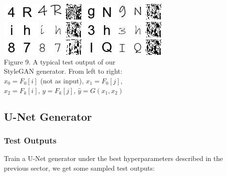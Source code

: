 \documentclass[letterpaper]{article}
\begin{document}
\begin{center}
    \includegraphics[width=.2\textwidth]{./update-figs/e2estylegan_1.jpg}
    \includegraphics[width=.2\textwidth]{./update-figs/e2estylegan_2.jpg}\\
    \includegraphics[width=.2\textwidth]{./update-figs/e2estylegan_3.jpg}
    \includegraphics[width=.2\textwidth]{./update-figs/e2estylegan_4.jpg}\\
    \includegraphics[width=.2\textwidth]{./update-figs/e2estylegan_5.jpg}
    \includegraphics[width=.2\textwidth]{./update-figs/e2estylegan_6.jpg}\\

    Figure 9. A typical test output of our\\StyleGAN generator. From left to right:\\$x_0=F_0[i]$ (not as input), $x_1=F_0[j]$,\\$x_2=F_k[i]$, $y=F_k[j]$, $\hat{y}=G(x_1,x_2)$
\end{center}

\subsection{U-Net Generator}
\subsubsection{Test Outputs}
Train a U-Net generator under the best hyperparameters described in the previous sector, we get some sampled test outputs:
\end{document}
